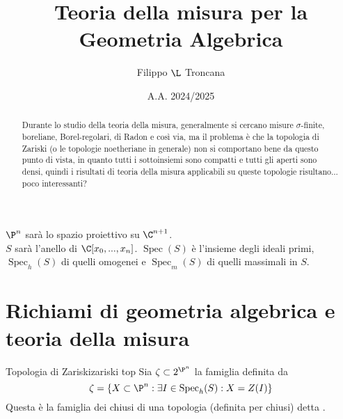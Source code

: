\documentclass{article}
\title{Teoria della misura per la Geometria Algebrica}
\date{A.A. 2024/2025}
\author{Filippo $\L$ Troncana}
\newcommand\spec{\operatorname{Spec}}
\newcommand\spech{\spec _h}
\newcommand\specm{\spec_m}
\begin{document}
\maketitle

\begin{abstract}
    Durante lo studio della teoria della misura, generalmente si cercano misure $\sigma$-finite, boreliane, Borel-regolari, di Radon e così via, ma il problema è che la topologia di Zariski (o le topologie noetheriane in generale) non si comportano bene da questo punto di vista, in quanto tutti i sottoinsiemi sono compatti e tutti gli aperti sono densi, quindi i risultati di teoria della misura applicabili su queste topologie risultano... poco interessanti?
\end{abstract}

\begin{notation}
    $\P^n$ sarà lo spazio proiettivo su $\C^{n+1}$.\\
    $S$ sarà l'anello di $\C[x_0,...,x_n]$.
    $\spec(S)$ è l'insieme degli ideali primi, $\spech(S)$ di quelli omogenei e $\specm(S)$ di quelli massimali in $S$.
\end{notation}

\section{Richiami di geometria algebrica e teoria della misura}

\begin{definition}{Topologia di Zariski}{zariski top}
    Sia $\zeta \subset 2^{\P^n}$ la famiglia definita da 
    \[\zeta = \{X \subset \P^n : \exists I \in \spech(S) : X = Z(I)\}\]
    Questa è la famiglia dei chiusi di una topologia (definita per chiusi) detta .
\end{definition}
\end{document}
